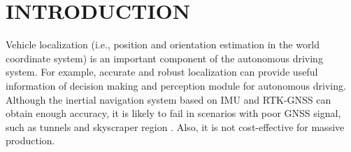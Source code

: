 \documentclass[letterpaper, 10 pt, conference]{ieeeconf}
\begin{document}
\begin{abstract}



 

\end{abstract}


\section{INTRODUCTION}

Vehicle localization (i.e., position and orientation estimation in the world coordinate system) is an important component of the autonomous driving system. For example, accurate and robust localization can provide useful information of decision making and perception module for autonomous driving.
Although the inertial navigation system based on IMU and RTK-GNSS can obtain enough accuracy, it is likely to fail in scenarios with poor GNSS signal, such as tunnels and skyscraper region \cite{jeong2019complex}. Also, it is not cost-effective for massive production. 
 
\end{document}
